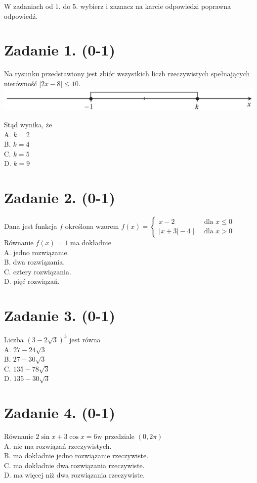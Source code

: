 \documentclass[10pt]{article}
\begin{document}
W zadaniach od 1. do 5. wybierz i zaznacz na karcie odpowiedzi poprawna odpowiedź.

\section*{Zadanie 1. (0-1)}
Na rysunku przedstawiony jest zbiór wszystkich liczb rzeczywistych spełnających nierówność \(|2 x-8| \leq 10\).\\
\includegraphics[max width=\textwidth, center]{2024_11_21_838c0cfd77f195c20440g-02}

Stąd wynika, że\\
A. \(k=2\)\\
B. \(k=4\)\\
C. \(k=5\)\\
D. \(k=9\)

\section*{Zadanie 2. (0-1)}
Dana jest funkcja \(f\) określona wzorem \(f(x)= \begin{cases}x-2 & \text { dla } x \leq 0 \\ |x+3|-4 \mid & \text { dla } x>0\end{cases}\)\\
Równanie \(f(x)=1\) ma dokładnie\\
A. jedno rozwiązanie.\\
B. dwa rozwiązania.\\
C. cztery rozwiązania.\\
D. pięć rozwiązań.

\section*{Zadanie 3. (0-1)}
Liczba \((3-2 \sqrt{3})^{3}\) jest równa\\
A. \(27-24 \sqrt{3}\)\\
B. \(27-30 \sqrt{3}\)\\
C. \(135-78 \sqrt{3}\)\\
D. \(135-30 \sqrt{3}\)

\section*{Zadanie 4. (0-1)}
Równanie \(2 \sin x+3 \cos x=6 \mathrm{w}\) przedziale \((0,2 \pi)\)\\
A. nie ma rozwiązań rzeczywistych.\\
B. ma dokładnie jedno rozwiązanie rzeczywiste.\\
C. ma dokładnie dwa rozwiązania rzeczywiste.\\
D. ma więcej niż dwa rozwiązania rzeczywiste.
\end{document}
